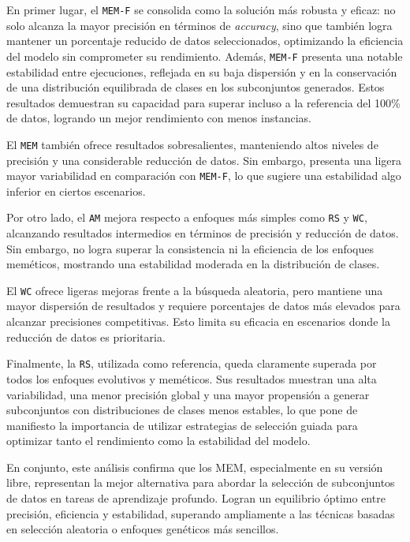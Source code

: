 En primer lugar, el \texttt{MEM-F} se consolida como la solución más robusta y eficaz: no solo alcanza la mayor precisión en términos de \textit{accuracy},
sino que también logra mantener un porcentaje reducido de datos seleccionados, optimizando la eficiencia del modelo sin comprometer su rendimiento.
Además, \texttt{MEM-F} presenta una notable estabilidad entre ejecuciones,
reflejada en su baja dispersión y en la conservación de una distribución equilibrada de clases en los subconjuntos generados.
Estos resultados demuestran su capacidad para superar incluso a la referencia del 100\% de datos, logrando un mejor rendimiento con menos instancias.

El \texttt{MEM} también ofrece resultados sobresalientes, manteniendo altos niveles de precisión y una considerable reducción de datos.
Sin embargo, presenta una ligera mayor variabilidad en comparación con \texttt{MEM-F}, lo que sugiere una estabilidad algo inferior en ciertos escenarios.

Por otro lado, el \texttt{AM} mejora respecto a enfoques más simples como \texttt{RS} y \texttt{WC}, alcanzando resultados intermedios en términos de precisión y reducción de datos.
Sin embargo, no logra superar la consistencia ni la eficiencia de los enfoques meméticos, mostrando una estabilidad moderada en la distribución de clases.

El \texttt{WC} ofrece ligeras mejoras frente a la búsqueda aleatoria,
pero mantiene una mayor dispersión de resultados y requiere porcentajes de datos más elevados para alcanzar precisiones competitivas.
Esto limita su eficacia en escenarios donde la reducción de datos es prioritaria.

Finalmente, la \texttt{RS}, utilizada como referencia, queda claramente superada por todos los enfoques evolutivos y meméticos.
Sus resultados muestran una alta variabilidad, una menor precisión global y una mayor propensión a generar subconjuntos con distribuciones de clases menos estables,
lo que pone de manifiesto la importancia de utilizar estrategias de selección guiada para optimizar tanto el rendimiento como la estabilidad del modelo.

En conjunto, este análisis confirma que los MEM, especialmente en su versión libre,
representan la mejor alternativa para abordar la selección de subconjuntos de datos en tareas de aprendizaje profundo.
Logran un equilibrio óptimo entre precisión, eficiencia y estabilidad, superando ampliamente a las técnicas basadas en selección aleatoria o enfoques genéticos más sencillos.


